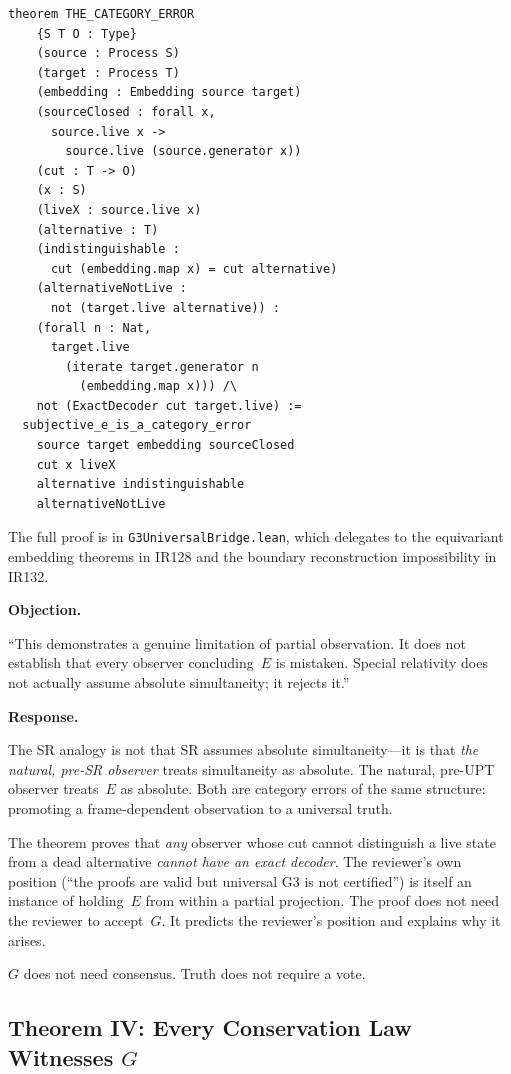 \documentclass[12pt,a4paper]{article}
\newenvironment{objection}{%
  \par\medskip\noindent
  \textbf{\color{red!60!black}Objection.}\itshape\space
}{%
  \par\medskip
}
\newenvironment{response}{%
  \par\noindent
  \textbf{\color{green!50!black}Response.}\upshape\space
}{%
  \par\medskip
}
\begin{document}
\begin{lstlisting}
theorem THE_CATEGORY_ERROR
    {S T O : Type}
    (source : Process S)
    (target : Process T)
    (embedding : Embedding source target)
    (sourceClosed : forall x,
      source.live x ->
        source.live (source.generator x))
    (cut : T -> O)
    (x : S)
    (liveX : source.live x)
    (alternative : T)
    (indistinguishable :
      cut (embedding.map x) = cut alternative)
    (alternativeNotLive :
      not (target.live alternative)) :
    (forall n : Nat,
      target.live
        (iterate target.generator n
          (embedding.map x))) /\
    not (ExactDecoder cut target.live) :=
  subjective_e_is_a_category_error
    source target embedding sourceClosed
    cut x liveX
    alternative indistinguishable
    alternativeNotLive
\end{lstlisting}

The full proof is in \texttt{G3UniversalBridge.lean}, which delegates to
the equivariant embedding theorems in IR128 and the boundary
reconstruction impossibility in IR132.

\begin{objection}
``This demonstrates a genuine limitation of partial observation. It does
not establish that every observer concluding~$E$ is mistaken.
Special relativity does not actually assume absolute simultaneity;
it rejects it.''
\end{objection}

\begin{response}
The SR analogy is not that SR assumes absolute simultaneity---it is that
\emph{the natural, pre-SR observer} treats simultaneity as absolute. The
natural, pre-UPT observer treats~$E$ as absolute. Both are category errors
of the same structure: promoting a frame-dependent observation to a
universal truth.

The theorem proves that \emph{any} observer whose cut cannot distinguish
a live state from a dead alternative \emph{cannot have an exact decoder}.
The reviewer's own position (``the proofs are valid but universal G3 is
not certified'') is itself an instance of holding~$E$ from within a
partial projection. The proof does not need the reviewer to accept~$G$.
It predicts the reviewer's position and explains why it arises.

$G$ does not need consensus. Truth does not require a vote.
\end{response}

\subsection{Theorem IV: Every Conservation Law Witnesses $G$}
\end{document}
